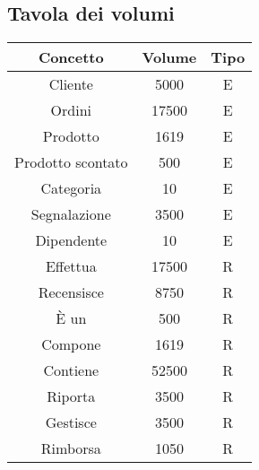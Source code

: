 \subsection{Tavola dei volumi}
\begin{center}
\begin{tabular}{ |c|c|c|} 
\hline
Concetto & Volume & Tipo \\
\hline
\multirow{2}{12em}{Cliente} & \multirow{2}{5em}{5000} & \multirow{2}{5em}{E}\\
 & &\\
 \hline
\multirow{2}{12em}{Ordini} & \multirow{2}{5em}{17500} & \multirow{2}{5em}{E}\\
 & &\\
\hline
\multirow{2}{12em}{Prodotto} & \multirow{2}{5em}{1619} & \multirow{2}{5em}{E}\\
 & &\\
\hline 
\multirow{2}{12em}{Prodotto scontato} & \multirow{2}{5em}{500} & \multirow{2}{5em}{E}\\
 & &\\
\hline 
\multirow{2}{12em}{Categoria} & \multirow{2}{5em}{10} & \multirow{2}{5em}{E}\\
 & &\\
\hline
\multirow{2}{12em}{Segnalazione} & \multirow{2}{5em}{3500} & \multirow{2}{5em}{E}\\
 & &\\
 \hline
\multirow{2}{12em}{Dipendente} & \multirow{2}{5em}{10} & \multirow{2}{5em}{E}\\
 & &\\
\hline
\multirow{2}{12em}{Effettua} & \multirow{2}{5em}{17500} & \multirow{2}{5em}{R}\\
 & &\\
\hline
\multirow{2}{12em}{Recensisce} & \multirow{2}{5em}{8750} & \multirow{2}{5em}{R}\\
 & &\\
\hline
\multirow{2}{12em}{È un} & \multirow{2}{5em}{500} & \multirow{2}{5em}{R}\\
 & &\\
\hline
\multirow{2}{12em}{Compone} & \multirow{2}{5em}{1619} & \multirow{2}{5em}{R}\\
 & &\\
\hline
\multirow{2}{12em}{Contiene} & \multirow{2}{5em}{52500} & \multirow{2}{5em}{R}\\
 & &\\
\hline
\multirow{2}{12em}{Riporta} & \multirow{2}{5em}{3500} & \multirow{2}{5em}{R}\\
 & &\\
\hline
\multirow{2}{12em}{Gestisce} & \multirow{2}{5em}{3500} & \multirow{2}{5em}{R}\\
 & &\\
\hline
\multirow{2}{12em}{Rimborsa} & \multirow{2}{5em}{1050} & \multirow{2}{5em}{R}\\
 & &\\
\hline
\end{tabular}
\end{center}